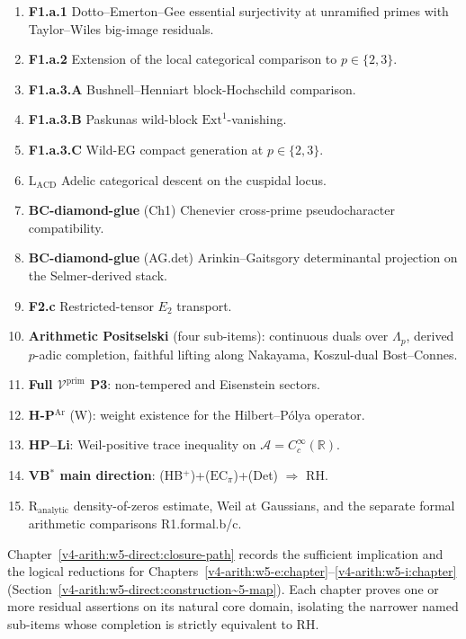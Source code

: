 \begin{enumerate}
\item \textbf{F1.a.1} Dotto--Emerton--Gee essential surjectivity at
unramified primes with Taylor--Wiles big-image residuals.
\item \textbf{F1.a.2} Extension of the local categorical comparison
to \(p\in\{2,3\}\).
\item \textbf{F1.a.3.A} Bushnell--Henniart block-Hochschild
comparison.
\item \textbf{F1.a.3.B} Paskunas wild-block
\(\mathrm{Ext}^{1}\)-vanishing.
\item \textbf{F1.a.3.C} Wild-EG compact generation at \(p\in\{2,3\}\).
\item \textbf{\(\mathrm{L}_{\mathrm{ACD}}\)} Adelic categorical descent
on the cuspidal locus.
\item \textbf{BC-diamond-glue} (Ch1) Chenevier cross-prime
pseudocharacter compatibility.
\item \textbf{BC-diamond-glue} (AG.det) Arinkin--Gaitsgory
determinantal projection on the Selmer-derived stack.
\item \textbf{F2.c} Restricted-tensor \(E_{2}\) transport.
\item \textbf{Arithmetic Positselski} (four sub-items): continuous
duals over \(\Lambda_{p}\), derived \(p\)-adic completion, faithful
lifting along Nakayama, Koszul-dual Bost--Connes.
\item \textbf{Full \(\mathcal{V}^{\mathrm{prim}}\) P3}:
non-tempered and Eisenstein sectors.
\item \textbf{H-P\(^{\mathrm{Ar}}\)} (W): weight existence for the
Hilbert--P\'olya operator.
\item \textbf{HP--Li}: Weil-positive trace inequality on
\(\mathscr A=C_c^\infty(\mathbb R)\).
\item \textbf{VB\(^{*}\) main direction}: (HB\(^{+}\))+(\(\mathrm{EC}_\pi\))+(Det)
\(\Rightarrow\) RH.
\item \textbf{\(\mathrm{R}_{\mathrm{analytic}}\)} density-of-zeros
estimate, Weil at Gaussians, and the separate formal arithmetic
comparisons R1.formal.b/c.
\end{enumerate}

Chapter~\ref{v4-arith:w5-direct:closure-path} records the
sufficient implication and the logical reductions for
Chapters~\ref{v4-arith:w5-e:chapter}--\ref{v4-arith:w5-i:chapter} (Section~\ref{v4-arith:w5-direct:construction~5-map}).
Each chapter proves one or more residual assertions on its natural
core domain, isolating the narrower named sub-items whose completion
is strictly equivalent to RH.

